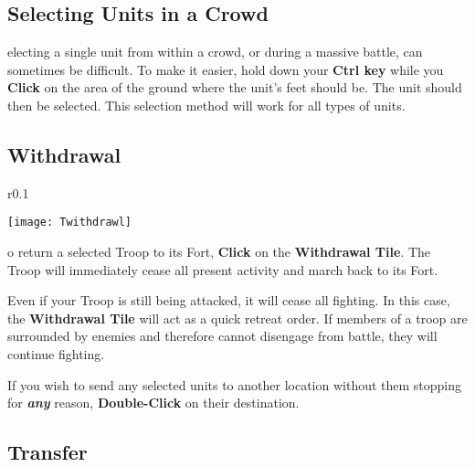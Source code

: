 \subsection{\textsf{Selecting Units in a Crowd}}



electing a single unit from within a crowd, or during a massive battle, can sometimes be difficult. To make it easier, hold down your \textbf{Ctrl key} while you \textbf{Click} on the area of the ground where the unit’s feet should be. The unit should then be selected. This selection method will work for all types of units.

\subsection{\textsf{Withdrawal}}


\begin{wrapfigure}{r}{0.1\textwidth}
    \vspace{-20pt}
    \begin{center}
        \texttt{[image: Twithdrawl]}
    \end{center}
    \vspace{-20pt}
\end{wrapfigure}

o return a selected Troop to its Fort, \textbf{Click} on the \textbf{Withdrawal Tile}. The Troop will immediately cease all present activity and march back to its Fort.

Even if your Troop is still being attacked, it will cease all fighting. In this case, the \textbf{Withdrawal Tile} will act as a quick retreat order. If members of a troop are surrounded by enemies and therefore cannot disengage from battle, they will continue fighting.

If you wish to send any selected units to another location without them stopping for \textbf{\textit{any}} reason, \textbf{Double-Click} on their destination.

\subsection{\textsf{Transfer}}


